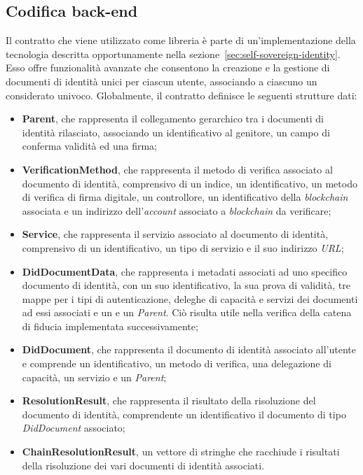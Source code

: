 \subsection{Codifica back-end}\label{subsec:codifica-back-end}
Il contratto che viene utilizzato come libreria è parte di un'implementazione della tecnologia  descritta opportunamente nella
sezione~\ref{sec:self-sovereign-identity}. Esso offre funzionalità avanzate che consentono la creazione e la gestione di documenti di identità
unici per ciascun utente, associando a ciascuno un  considerato univoco.
Globalmente, il contratto definisce le seguenti strutture dati:
\begin{itemize}
    \item \textbf{Parent}, che rappresenta il collegamento gerarchico tra i documenti di identità rilasciato, associando un identificativo al genitore,
    un campo di conferma validità ed una firma;
    \item \textbf{VerificationMethod}, che rappresenta il metodo di verifica associato al documento di identità, comprensivo di un indice, un identificativo,
    un metodo di verifica di firma digitale, un controllore, un identificativo della \textit{blockchain} associata e un indirizzo dell'\textit{account} associato a \textit{blockchain} da verificare;
    \item \textbf{Service}, che rappresenta il servizio associato al documento di identità, comprensivo di un identificativo, un tipo di servizio e il suo indirizzo \textit{URL};
    \item \textbf{DidDocumentData}, che rappresenta i metadati associati ad uno specifico documento di identità, con un suo identificativo, la sua prova di validità, tre mappe per i tipi di autenticazione, deleghe di capacità
    e servizi dei documenti ad essi associati e un e un \textit{Parent}. Ciò risulta utile nella verifica della catena di fiducia implementata successivamente;
    \item \textbf{DidDocument}, che rappresenta il documento di identità associato all'utente e comprende un identificativo, un metodo di verifica, una delegazione di capacità, un servizio e un \textit{Parent};
    \item \textbf{ResolutionResult}, che rappresenta il risultato della risoluzione del documento di identità, comprendente un identificativo il documento di tipo \textit{DidDocument} associato;
    \item \textbf{ChainResolutionResult}, un vettore di stringhe che racchiude i risultati della risoluzione dei vari documenti di identità associati.
\end{itemize}

